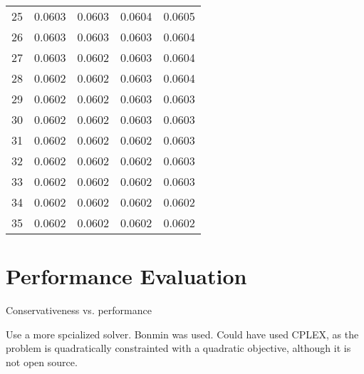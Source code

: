 \begin{table}[H]
\begin{tabular}{|c|cccc|}
        25 & 0.0603 & 0.0603 & 0.0604 & 0.0605 \\
        26 & 0.0603 & 0.0603 & 0.0603 & 0.0604 \\
        27 & 0.0603 & 0.0602 & 0.0603 & 0.0604 \\
        28 & 0.0602 & 0.0602 & 0.0603 & 0.0604 \\
        29 & 0.0602 & 0.0602 & 0.0603 & 0.0603 \\
        30 & 0.0602 & 0.0602 & 0.0603 & 0.0603 \\
        31 & 0.0602 & 0.0602 & 0.0602 & 0.0603 \\
        32 & 0.0602 & 0.0602 & 0.0602 & 0.0603 \\
        33 & 0.0602 & 0.0602 & 0.0602 & 0.0603 \\
        34 & 0.0602 & 0.0602 & 0.0602 & 0.0602 \\
        35 & 0.0602 & 0.0602 & 0.0602 & 0.0602 \\
        \hline
    \end{tabular}
\end{table}

\section{Performance Evaluation}
\label{sec:performance-evaluation}

Conservativeness vs. performance

Use a more spcialized solver. Bonmin was used. Could have used CPLEX, as the problem is quadratically constrainted with a quadratic objective, although it is not open source. 